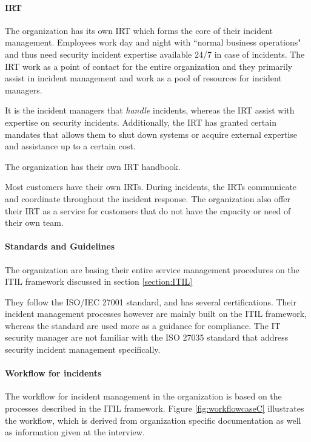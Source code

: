 \paragraph{\acl{IRT}}
The organization has its own \ac{IRT} which forms the core of their incident management. Employees work day and night with ``normal business operations" and thus need security incident expertise available 24/7 in case of incidents. The \ac{IRT} work as a point of contact for the entire organization and they primarily assist in incident management and work as a pool of resources for incident managers.

It is the incident managers that \emph{handle} incidents, whereas the \ac{IRT} assist with expertise on security incidents. Additionally, the \ac{IRT} has granted certain mandates that allows them to shut down systems or acquire external expertise and assistance up to a certain cost.    

The organization has their own \ac{IRT} handbook.

Most customers have their own \acp{IRT}. During incidents, the \acp{IRT} communicate and coordinate throughout the incident response. The organization also offer their \ac{IRT} as a service for customers that do not have the capacity or need of their own team. 

\paragraph{Standards and Guidelines}
The organization are basing their entire service management procedures on the ITIL framework discussed in section \ref{section:ITIL} 

They follow the ISO/IEC 27001 standard, and has several certifications. Their incident management processes however are mainly built on the ITIL framework, whereas the standard are used more as a guidance for compliance. The IT security manager are not familiar with the ISO 27035 standard that address security incident management specifically. 

\paragraph{Workflow for incidents}
The workflow for incident management in the organization is based on the processes described in the ITIL framework. Figure \ref{fig:workflowcaseC} illustrates the workflow, which is derived from organization specific documentation as well as information given at the interview. 

